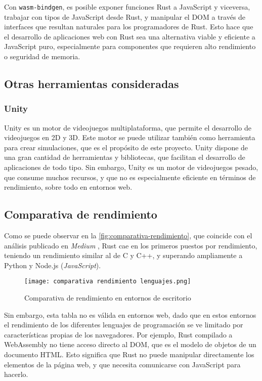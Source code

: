 Con \texttt{wasm-bindgen}, es posible exponer funciones Rust a JavaScript y viceversa, trabajar con tipos de JavaScript desde Rust, y manipular el DOM a través de interfaces que resultan naturales para los programadores de Rust. Esto hace que el desarrollo de aplicaciones web con Rust sea una alternativa viable y eficiente a JavaScript puro, especialmente para componentes que requieren alto rendimiento o seguridad de memoria.

\subsection{Otras herramientas consideradas}
\subsubsection{Unity}
Unity es un motor de videojuegos multiplataforma, que permite el desarrollo de videojuegos en 2D y 3D. Este motor se puede utilizar también como herramienta para crear simulaciones, que es el propósito de este proyecto. Unity dispone de una gran cantidad de herramientas y bibliotecas, que facilitan el desarrollo de aplicaciones de todo tipo. Sin embargo, Unity es un motor de videojuegos pesado, que consume muchos recursos, y que no es especialmente eficiente en términos de rendimiento, sobre todo en entornos web.

\subsection{Comparativa de rendimiento}

Como se puede observar en la \autoref{fig:comparativa-rendimiento}, que coincide con el análisis publicado en \textit{Medium} \autocite{samTop10Fastest2024}, Rust cae en los primeros puestos por rendimiento, teniendo un rendimiento similar al de C y C++, y superando ampliamente a Python y Node.js (\textit{JavaScript}).

\begin{figure}[H]
    \centering
    \texttt{[image: comparativa rendimiento lenguajes.png]}
    \caption{Comparativa de rendimiento en entornos de escritorio \autocite{zotero-253}}
    \label{fig:comparativa-rendimiento}
\end{figure}


Sin embargo, esta tabla no es válida en entornos web, dado que en estos entornos el rendimiento de los diferentes lenguajes de programación se ve limitado por características propias de los navegadores. Por ejemplo, Rust compilado a WebAssembly no tiene acceso directo al \ac{DOM}, que es el modelo de objetos de un documento HTML. Esto significa que Rust no puede manipular directamente los elementos de la página web, y que necesita comunicarse con JavaScript para hacerlo. 

